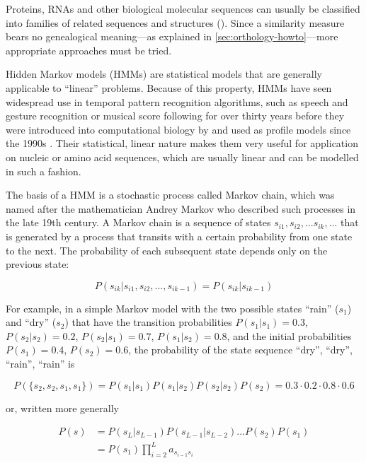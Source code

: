 \label{sec:hmms}
Proteins, RNAs and other biological molecular sequences can usually be
classified into families of related sequences and structures
(\cite{henikoff1997}). Since a similarity measure bears no genealogical
meaning---as explained in \autoref{sec:orthology-howto}---more appropriate
approaches must be tried.

Hidden Markov models (HMMs) are statistical models that are generally applicable
to ``linear'' problems. Because of this property, HMMs have seen widespread use
in temporal pattern recognition algorithms, such as speech and gesture
recognition or musical score following for over thirty years \citep{rabiner1989}
before they were introduced into computational biology by \citet{churchill1989}
and used as profile models since the 1990s \citep{krogh1994}. Their statistical,
linear nature makes them very useful for application on nucleic or amino acid
sequences, which are usually linear and can be modelled in such a fashion. 

The basis of a HMM is a stochastic process called Markov chain, which was named
after the mathematician Andrey Markov who described such processes in the late
19th century. A Markov chain is a sequence of states $s_{i1}, s_{i2}, ...
s_{ik}, ...$ that is generated by a process that transits with a certain
probability from one state to the next. The probability of each subsequent state
depends only on the previous state:

\begin{equation}
P(s_{ik} | s_{i1}, s_{i2}, ..., s_{ik-1}) = P(s_{ik} | s_{ik-1})
\label{eqn:markov-chain}
\end{equation}

For example, in a simple Markov model with the two possible states ``rain''
($s_1$) and ``dry'' ($s_2$) that have the transition probabilities $P(s_1|s_1) =
0.3$, $P(s_2|s_2) = 0.2$, $P(s_2|s_1) = 0.7$, $P(s_1|s_2) = 0.8$, and the
initial probabilities $P(s_1) = 0.4$, $P(s_2) = 0.6$, the probability of the
state sequence ``dry'', ``dry'', ``rain'', ``rain'' is

\begin{equation}
P(\{s_2, s_2, s_1, s_1\}) = P(s_1|s_1) P(s_1|s_2) P(s_2|s_2) P(s_2) = 0.3 \cdot 0.2 \cdot 0.8 \cdot 0.6
\label{eqn:markov-chain-weather}
\end{equation}

or, written more generally

\begin{equation}
	\begin{split}
		P(s) &= P(s_L|s_{L-1}) P(s_{L-1}|s_{L-2}) . . . P(s_2) P(s_1) \\
		&= P(s_1) \prod^{L}_{i=2}a_{s_{i-1}s_{i}}
	\end{split}
	\label{eqn:markov-chain-general}
\end{equation}

